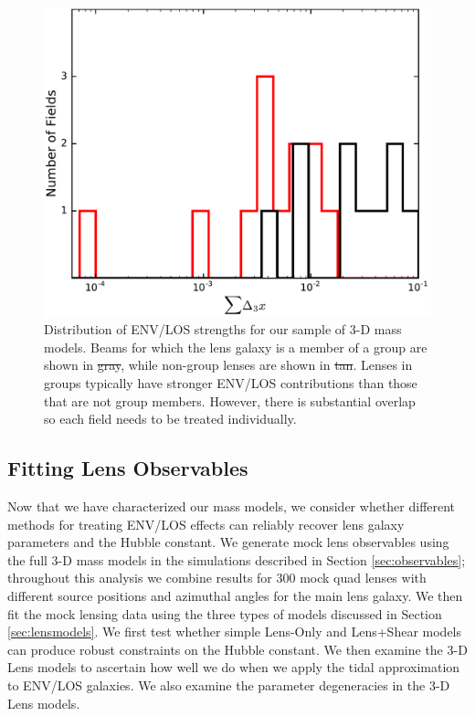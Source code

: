 \documentclass{emulateapj}
\providecommand{\DIFaddtex}[1]{{\protect\color{blue}\uwave{#1}}} %
\providecommand{\DIFdeltex}[1]{{\protect\color{red}\sout{#1}}}                      %
\providecommand{\DIFaddFL}[1]{\DIFadd{#1}} %
\providecommand{\DIFdelFL}[1]{\DIFdel{#1}} %
\providecommand{\DIFaddbeginFL}{} %
\providecommand{\DIFaddendFL}{} %
\providecommand{\DIFdelbeginFL}{} %
\providecommand{\DIFdelendFL}{} %
\providecommand{\DIFadd}[1]{\texorpdfstring{\DIFaddtex{#1}}{#1}} %
\providecommand{\DIFdel}[1]{\texorpdfstring{\DIFdeltex{#1}}{}} %
\begin{document}
\begin{figure}[!t]
\centering
\includegraphics[width=\columnwidth]{d3xsums.pdf}
\caption{Distribution of ENV/LOS strengths for our sample of 3-D mass models. Beams for which the lens galaxy is a member of a group are shown in \DIFdelbeginFL \DIFdelFL{gray}\DIFdelendFL \DIFaddbeginFL \DIFaddFL{black}\DIFaddendFL , while non-group lenses are shown in \DIFdelbeginFL \DIFdelFL{tan}\DIFdelendFL \DIFaddbeginFL \DIFaddFL{red}\DIFaddendFL . Lenses in groups typically have stronger ENV/LOS contributions than those that are not group members. However, there is substantial overlap so each field needs to be treated individually.}
\label{fig:d3xsums}
\end{figure}

\subsection{Fitting Lens Observables}
\label{sec:fitting}
Now that we have characterized our mass models, we consider whether different methods for treating ENV/LOS effects can reliably recover lens galaxy parameters and the Hubble constant. We generate mock lens observables using the full 3-D mass models in the simulations described in Section \ref{sec:observables}; throughout this analysis we combine results for 300 mock quad lenses with different source positions and azimuthal angles for the main lens galaxy. We then fit the mock lensing data using the three types of models discussed in Section \ref{sec:lensmodels}. We first test whether simple Lens-Only and Lens+Shear models can produce robust constraints on the Hubble constant. We then examine the 3-D Lens models to ascertain how well we do when we apply the tidal approximation to ENV/LOS galaxies. We also examine the parameter degeneracies in the 3-D Lens models.
\end{document}
